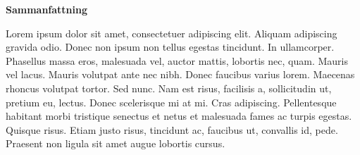 \documentclass{tex/martin}
\begin{document}


\cleardoublepage

\begin{center}
\sffamily\textbf{Sammanfattning} 
\end{center}
Lorem ipsum dolor sit amet, consectetuer adipiscing elit. Aliquam adipiscing gravida odio. Donec non ipsum non tellus egestas tincidunt. In ullamcorper. Phasellus massa eros, malesuada vel, auctor mattis, lobortis nec, quam. Mauris vel lacus. Mauris volutpat ante nec nibh. Donec faucibus varius lorem. Maecenas rhoncus volutpat tortor. Sed nunc. Nam est risus, facilisis a, sollicitudin ut, pretium eu, lectus. Donec scelerisque mi at mi. Cras adipiscing. Pellentesque habitant morbi tristique senectus et netus et malesuada fames ac turpis egestas. Quisque risus. Etiam justo risus, tincidunt ac, faucibus ut, convallis id, pede. Praesent non ligula sit amet augue lobortis cursus.
\end{document}
